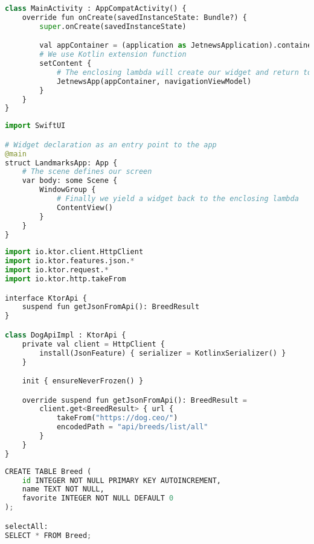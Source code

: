 \begin{lstlisting}[style=light, language=Python,label={lst:android_jetpack_compose},caption=Android Jetpack Compose]
class MainActivity : AppCompatActivity() {
    override fun onCreate(savedInstanceState: Bundle?) {
        super.onCreate(savedInstanceState)

        val appContainer = (application as JetnewsApplication).container
        # We use Kotlin extension function
        setContent {
            # The enclosing lambda will create our widget and return to the app
            JetnewsApp(appContainer, navigationViewModel)
        }
    }
}
\end{lstlisting}

\begin{lstlisting}[style=light, language=Python,label={lst:ios_swift_ui},caption=Swift UI]
import SwiftUI

# Widget declaration as an entry point to the app
@main
struct LandmarksApp: App {
    # The scene defines our screen
    var body: some Scene {
        WindowGroup {
            # Finally we yield a widget back to the enclosing lambda
            ContentView()
        }
    }
}
\end{lstlisting}

\begin{lstlisting}[style=light, language=Python,label={lst:kmm_ktor},caption=Ktor]
import io.ktor.client.HttpClient
import io.ktor.features.json.*
import io.ktor.request.*
import io.ktor.http.takeFrom

interface KtorApi {
    suspend fun getJsonFromApi(): BreedResult
}

class DogApiImpl : KtorApi {
    private val client = HttpClient {
        install(JsonFeature) { serializer = KotlinxSerializer() }
    }

    init { ensureNeverFrozen() }

    override suspend fun getJsonFromApi(): BreedResult =
        client.get<BreedResult> { url {
            takeFrom("https://dog.ceo/")
            encodedPath = "api/breeds/list/all"
        }
    }
}
\end{lstlisting}

\begin{lstlisting}[style=light, language=Python,label={lst:table_sq},caption=Table.sq]
CREATE TABLE Breed (
    id INTEGER NOT NULL PRIMARY KEY AUTOINCREMENT,
    name TEXT NOT NULL,
    favorite INTEGER NOT NULL DEFAULT 0
);

selectAll:
SELECT * FROM Breed;
\end{lstlisting}

